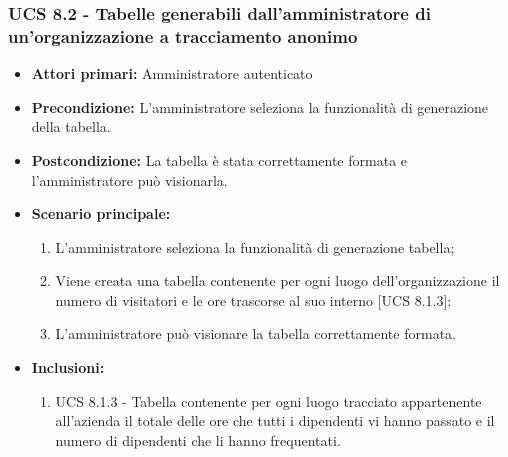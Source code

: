 \subsubsection{UCS 8.2 - Tabelle generabili dall'amministratore di un'organizzazione a tracciamento anonimo}%
\begin{itemize}
\item \textbf{Attori primari:} Amministratore autenticato
\item \textbf{Precondizione:} L'amministratore seleziona la funzionalità di generazione della tabella.
\item \textbf{Postcondizione:} La tabella è stata correttamente formata e l'amministratore può visionarla.
\item \textbf{Scenario principale:}
	\begin{enumerate}%
	\item L'amministratore seleziona la funzionalità di generazione tabella;
	\item Viene creata una tabella contenente per ogni luogo dell'organizzazione il numero di visitatori e le ore trascorse al suo interno [UCS 8.1.3];
	\item L'amministratore può visionare la tabella correttamente formata.
\end{enumerate}
\item \textbf{Inclusioni:} 
\begin{enumerate}
		\item UCS 8.1.3 - Tabella contenente per ogni luogo tracciato appartenente all'azienda il totale delle ore che tutti i dipendenti vi hanno passato e il numero di dipendenti che li hanno frequentati.
	\end{enumerate}
\end{itemize}
